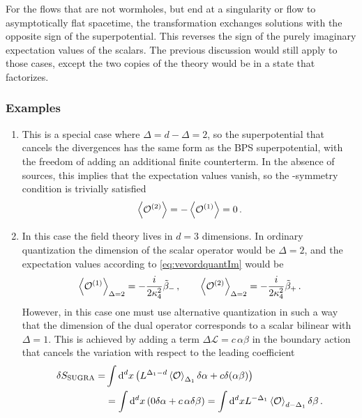 For the flows that are not wormholes, but end at a singularity or flow to asymptotically flat spacetime, the \PT transformation exchanges solutions with the opposite sign of the superpotential.
This reverses the sign of the purely imaginary expectation values of the scalars.
The previous discussion would still apply to those cases, except the two copies of the theory would be in a state that factorizes.

\subsubsection{Examples}

\begin{enumerate}
	\item This is a special case where $\Delta=d-\Delta=2$, so the superpotential that cancels the divergences has the same form as the BPS superpotential, with the freedom of adding an additional finite counterterm.
	In the absence of sources, this implies that the expectation values vanish, so the \PT-symmetry condition is trivially satisfied 
	\begin{equation}     
	\left\langle{\mathcal{O}^{(2)}}\right\rangle=-\left\langle{\mathcal{O}^{(1)}}\right\rangle=0\,.
	\end{equation}
	\item In this case the field theory lives in $d=3$ dimensions.
	In ordinary quantization the dimension of the scalar operator would be $\Delta=2$, and the expectation values according to \cref{eq:vevordquantIm} would be
\begin{equation}
	\left\langle{\mathcal{O}^{(1)}}\right\rangle_{\Delta=2}=-\frac{i}{2\kappa_4^2} \tilde\beta_-
	\,,\qquad
	\left\langle{\mathcal{O}^{(2)}}\right\rangle_{\Delta=2}=-\frac{i}{2\kappa_4^2} \tilde\beta_+\,.
\end{equation}
However, in this case one must use alternative quantization in such a way that the dimension of the dual operator corresponds to a scalar bilinear with $\Delta=1$.
This is achieved by adding a term  $\Delta \mathcal{L}=c\,\alpha \beta$ in the boundary action that cancels the variation with respect to the leading coefficient
\begin{equation}
\begin{split}
	\delta S_{\text{SUGRA}}=&\int \mathrm{d}^dx\left(L^{\Delta_1-d}\left\langle{\mathcal{O}}\right\rangle_{\Delta_1}\delta \alpha+c\delta(\alpha \beta)\right)\\
	&=\int \mathrm{d}^d x\left(0 \delta \alpha+c\,\alpha\delta \beta\right)=\int \mathrm{d}^d x L^{-\Delta_1}\left\langle{\mathcal{O}}\right\rangle_{d-\Delta_1}\delta \beta\,.
\end{split}
\end{equation}

\end{enumerate}
